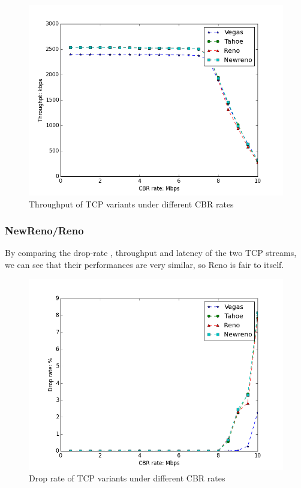 \documentclass[10pt, conference]{IEEEtran/IEEEtran}
\begin{document}
\begin{figure}[htbp]
\begin{center}
\includegraphics[width=\linewidth]{../exp1/exp1_thpt.png}
\caption{Throughput of TCP variants under different CBR rates}
\label{exp1_thpt}
\end{center}
\end{figure}

\subsubsection{NewReno/Reno}
By comparing the drop-rate , throughput and latency of the two TCP streams,  we can see that their performances are very similar, so Reno is fair to itself. 

\begin{figure}[htbp]
\begin{center}
\includegraphics[width=\linewidth]{../exp1/exp1_drop.png}
\caption{Drop rate of TCP variants under different CBR rates}
\label{exp1_drop}
\end{center}
\end{figure}
\end{document}
